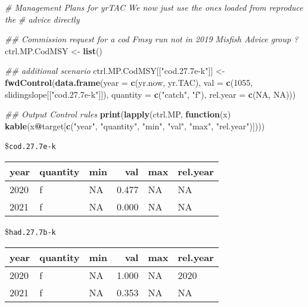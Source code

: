 \documentclass[
]{article}
\newenvironment{Shaded}{\begin{snugshade}}{\end{snugshade}}
\newcommand{\CommentTok}[1]{\textcolor[rgb]{0.56,0.35,0.01}{\textit{#1}}}
\newcommand{\ControlFlowTok}[1]{\textcolor[rgb]{0.13,0.29,0.53}{\textbf{#1}}}
\newcommand{\DataTypeTok}[1]{\textcolor[rgb]{0.13,0.29,0.53}{#1}}
\newcommand{\DecValTok}[1]{\textcolor[rgb]{0.00,0.00,0.81}{#1}}
\newcommand{\KeywordTok}[1]{\textcolor[rgb]{0.13,0.29,0.53}{\textbf{#1}}}
\newcommand{\NormalTok}[1]{#1}
\newcommand{\OperatorTok}[1]{\textcolor[rgb]{0.81,0.36,0.00}{\textbf{#1}}}
\newcommand{\OtherTok}[1]{\textcolor[rgb]{0.56,0.35,0.01}{#1}}
\newcommand{\StringTok}[1]{\textcolor[rgb]{0.31,0.60,0.02}{#1}}
\begin{document}
\begin{Shaded}
\begin{Highlighting}[]
\CommentTok{# Management Plans for yrTAC We now just use the ones loaded from reproduce the}
\CommentTok{# advice directly}

\CommentTok{## Commission request for a cod Fmsy run not in 2019 Misfish Advice group ?}
\NormalTok{ctrl.MP.CodMSY <-}\StringTok{ }\KeywordTok{list}\NormalTok{()}


\CommentTok{## additional scenario}
\NormalTok{ctrl.MP.CodMSY[[}\StringTok{"cod.27.7e-k"}\NormalTok{]] <-}\StringTok{ }\KeywordTok{fwdControl}\NormalTok{(}\KeywordTok{data.frame}\NormalTok{(}\DataTypeTok{year =} \KeywordTok{c}\NormalTok{(yr.now, yr.TAC), }
    \DataTypeTok{val =} \KeywordTok{c}\NormalTok{(}\DecValTok{1055}\NormalTok{, slidingslope[[}\StringTok{"cod.27.7e-k"}\NormalTok{]]), }\DataTypeTok{quantity =} \KeywordTok{c}\NormalTok{(}\StringTok{"catch"}\NormalTok{, }\StringTok{"f"}\NormalTok{), }\DataTypeTok{rel.year =} \KeywordTok{c}\NormalTok{(}\OtherTok{NA}\NormalTok{, }
        \OtherTok{NA}\NormalTok{)))}

\CommentTok{## Output Control rules}
\KeywordTok{print}\NormalTok{(}\KeywordTok{lapply}\NormalTok{(ctrl.MP, }\ControlFlowTok{function}\NormalTok{(x) }\KeywordTok{kable}\NormalTok{(x}\OperatorTok{@}\NormalTok{target[}\KeywordTok{c}\NormalTok{(}\StringTok{"year"}\NormalTok{, }\StringTok{"quantity"}\NormalTok{, }\StringTok{"min"}\NormalTok{, }\StringTok{"val"}\NormalTok{, }
    \StringTok{"max"}\NormalTok{, }\StringTok{"rel.year"}\NormalTok{)])))}
\end{Highlighting}
\end{Shaded}

\$\texttt{cod.27.7e-k}

\begin{longtable}[]{@{}lllrll@{}}
\toprule
year & quantity & min & val & max & rel.year\tabularnewline
\midrule
\endhead
2020 & f & NA & 0.477 & NA & NA\tabularnewline
2021 & f & NA & 0.000 & NA & NA\tabularnewline
\bottomrule
\end{longtable}

\$\texttt{had.27.7b-k}

\begin{longtable}[]{@{}lllrll@{}}
\toprule
year & quantity & min & val & max & rel.year\tabularnewline
\midrule
\endhead
2020 & f & NA & 1.000 & NA & 2020\tabularnewline
2021 & f & NA & 0.353 & NA & NA\tabularnewline
\bottomrule
\end{longtable}
\end{document}
